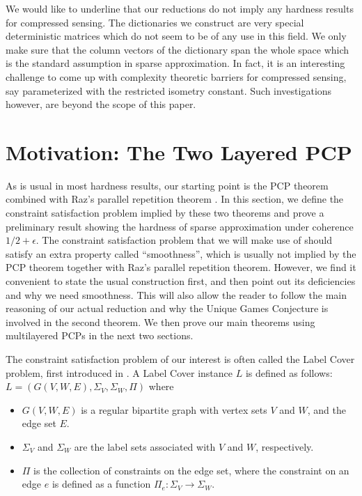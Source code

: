 \documentclass[11pt]{article}
\begin{document}
We would like to underline that our reductions do not imply
any hardness results for compressed sensing. The dictionaries
we construct are very special deterministic matrices which
do not seem to be of any use in this field. We only make
sure that the column vectors of the dictionary span the
whole space which is the standard assumption in sparse
approximation. In fact, it is an interesting challenge to
come up with complexity theoretic barriers for compressed
sensing, say parameterized with the restricted isometry
constant. Such investigations however, are beyond the scope of this
paper.
\section{Motivation: The Two Layered PCP}
As is usual in most hardness results, our starting point
is the PCP theorem \cite{Pcp,Pcp2} combined with Raz's parallel
repetition theorem \cite{Raz}. In this section, we define the
constraint satisfaction problem implied by these two theorems
and prove a preliminary result showing the hardness of sparse
approximation under coherence $1/2+\epsilon$. The constraint
satisfaction problem that we will make use of should satisfy
an extra property called ``smoothness'', which is usually not
implied by the PCP theorem together with Raz's parallel
repetition theorem. However, we find it convenient to state
the usual construction first, and then point out its
deficiencies and why we need smoothness. This will also allow
the reader to follow the main reasoning of our actual reduction
and why the Unique Games Conjecture is involved in the second
theorem. We then prove our main theorems using multilayered
PCPs in the next two sections.

The constraint satisfaction problem of our interest is often
called the Label Cover problem, first introduced in
\cite{LC}. A Label Cover instance $L$ is defined as
follows: $L = (G(V,W,E),\Sigma_V, \Sigma_W,\Pi)$ where

\begin{itemize}
\item $G(V,W,E)$ is a regular bipartite graph with vertex sets $V$
and $W$, and the edge set $E$. \vspace{1mm}

\item $\Sigma_V$ and $\Sigma_W$ are the label sets associated with
$V$ and $W$, respectively. \vspace{1mm}

\item $\Pi$ is the collection of constraints on the edge set,
where the constraint on an edge $e$ is defined as a function
$\Pi_e\colon \Sigma_V \rightarrow \Sigma_W$.
\end{itemize}
\end{document}
